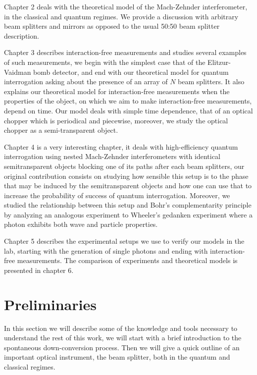 \documentclass[12pt]{book}
\begin{document}
Chapter 2 deals with the theoretical model of the Mach-Zehnder interferometer, in the classical and quantum regimes. We provide a discussion with arbitrary beam splitters and mirrors as opposed to the usual 50:50 beam splitter description.

Chapter 3 describes interaction-free measurements and studies several examples of such measurements, we begin with the simplest case that of the Elitzur-Vaidman bomb detector, and end with our theoretical model for quantum interrogation asking about the presence of an array of $N$ beam splitters. It also explains our theoretical model for interaction-free measurements when the properties of the object, on which we aim to make interaction-free measurements, depend on time. Our model deals with simple time dependence, that of an optical chopper which is periodical and piecewise, moreover, we study the optical chopper as a semi-transparent object.

Chapter 4 is a very interesting chapter, it deals with high-efficiency quantum interrogation using nested Mach-Zehnder interferometers with identical semitransparent objects blocking one of its paths after each beam splitters, our original contribution consists on studying how sensible this setup is to the phase that may be induced by the semitransparent objects and how one can use that to increase the probability of success of quantum interrogation. Moreover, we studied the relationship between this setup and Bohr's complementarity principle by analyzing an analogous experiment to Wheeler's gedanken experiment where a photon exhibits both wave and particle properties.

Chapter 5 describes the experimental setups we use to verify our models in the lab, starting with the generation of single photons and ending with interaction-free measurements. The comparison of experiments and theoretical models is presented in chapter 6.
 
  
\pagebreak



\chapter{Preliminaries}

In this section we will describe some of the knowledge and tools necessary to understand the rest of this work, we will start with a brief introduction to the spontaneous down-conversion process. Then we will give a quick outline of an important optical instrument, the beam splitter, both in the quantum and classical regimes.
\end{document}
